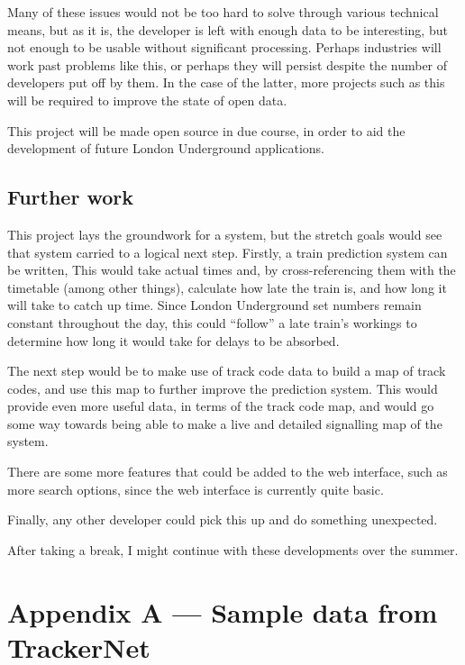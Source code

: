\documentclass[a4paper,12pt,twoside]{report}
\begin{document}
Many of these issues would not be too hard to solve through various technical
means, but as it is, the developer is left with enough data to be interesting,
but not enough to be usable without significant processing. Perhaps industries
will work past problems like this, or perhaps they will persist despite the
number of developers put off by them. In the case of the latter, more projects
such as this will be required to improve the state of open data.

This project will be made open source in due course, in order to aid the
development of future London Underground applications.

\section{Further work}

This project lays the groundwork for a system, but the stretch goals would see
that system carried to a logical next step. Firstly, a train prediction system
can be written, This would take actual times and, by cross-referencing them
with the timetable (among other things), calculate how late the train is, and
how long it will take to catch up time. Since London Underground set numbers
remain constant throughout the day, this could ``follow'' a late train's workings
to determine how long it would take for delays to be absorbed.

The next step would be to make use of track code data to build a map of track
codes, and use this map to further improve the prediction system. This would
provide even more useful data, in terms of the track code map, and would go
some way towards being able to make a live and detailed signalling map of the
system.

There are some more features that could be added to the web interface, such as
more search options, since the web interface is currently quite basic.

Finally, any other developer could pick this up and do something unexpected.

After taking a break, I might continue with these developments over the summer.

\pagebreak





\chapter*{Appendix A --- Sample data from TrackerNet}
\end{document}
